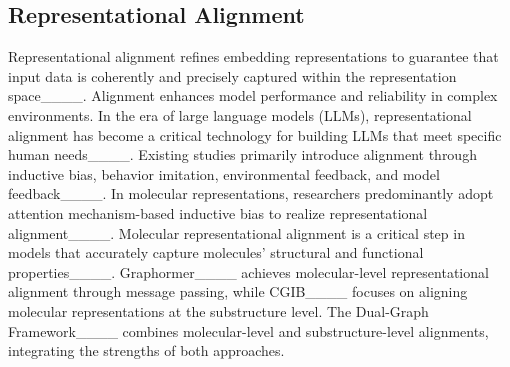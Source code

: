 


\subsection{Representational Alignment}
Representational alignment refines embedding representations to guarantee that input data is coherently and precisely captured within the representation space____. Alignment enhances model performance and reliability in complex environments. In the era of large language models (LLMs), representational alignment has become a critical technology for building LLMs that meet specific human needs____.
Existing studies primarily introduce alignment through inductive bias, behavior imitation, environmental feedback, and model feedback____. In molecular representations, researchers predominantly adopt attention mechanism-based inductive bias to realize representational alignment____.
Molecular representational alignment is a critical step in models that accurately capture molecules' structural and functional properties____.
Graphormer____ achieves molecular-level representational alignment through message passing, while CGIB____ focuses on aligning molecular representations at the substructure level. The Dual-Graph Framework____ combines molecular-level and substructure-level alignments, integrating the strengths of both approaches.


